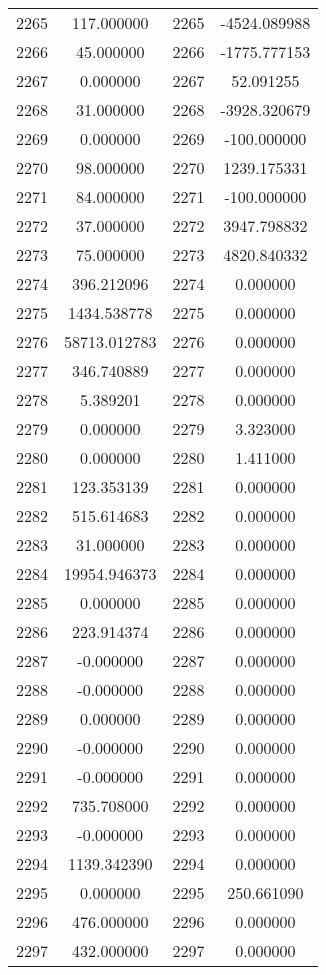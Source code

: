 \documentclass[12pt]{article}
\begin{document}
\begin{longtable}{@{}cccc@{}}
2265 & 117.000000 & 2265 & -4524.089988 \\
2266 & 45.000000 & 2266 & -1775.777153 \\
2267 & 0.000000 & 2267 & 52.091255 \\
2268 & 31.000000 & 2268 & -3928.320679 \\
2269 & 0.000000 & 2269 & -100.000000 \\
2270 & 98.000000 & 2270 & 1239.175331 \\
2271 & 84.000000 & 2271 & -100.000000 \\
2272 & 37.000000 & 2272 & 3947.798832 \\
2273 & 75.000000 & 2273 & 4820.840332 \\
2274 & 396.212096 & 2274 & 0.000000 \\
2275 & 1434.538778 & 2275 & 0.000000 \\
2276 & 58713.012783 & 2276 & 0.000000 \\
2277 & 346.740889 & 2277 & 0.000000 \\
2278 & 5.389201 & 2278 & 0.000000 \\
2279 & 0.000000 & 2279 & 3.323000 \\
2280 & 0.000000 & 2280 & 1.411000 \\
2281 & 123.353139 & 2281 & 0.000000 \\
2282 & 515.614683 & 2282 & 0.000000 \\
2283 & 31.000000 & 2283 & 0.000000 \\
2284 & 19954.946373 & 2284 & 0.000000 \\
2285 & 0.000000 & 2285 & 0.000000 \\
2286 & 223.914374 & 2286 & 0.000000 \\
2287 & -0.000000 & 2287 & 0.000000 \\
2288 & -0.000000 & 2288 & 0.000000 \\
2289 & 0.000000 & 2289 & 0.000000 \\
2290 & -0.000000 & 2290 & 0.000000 \\
2291 & -0.000000 & 2291 & 0.000000 \\
2292 & 735.708000 & 2292 & 0.000000 \\
2293 & -0.000000 & 2293 & 0.000000 \\
2294 & 1139.342390 & 2294 & 0.000000 \\
2295 & 0.000000 & 2295 & 250.661090 \\
2296 & 476.000000 & 2296 & 0.000000 \\
2297 & 432.000000 & 2297 & 0.000000 \\

\end{longtable}
\end{document}
